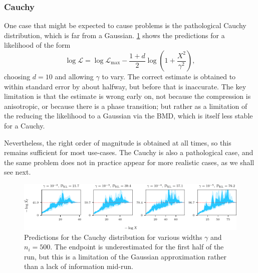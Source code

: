 \documentclass[usenatbib]{mnras}
\newcommand{\nlive}{n_i}
\begin{document}
\subsubsection{Cauchy}
One case that might be expected to cause problems is the pathological Cauchy distribution, which is far from a Gaussian. \cref{fig:cauchy_predictions} shows the predictions for a likelihood of the form
\begin{equation}
	\log\mathcal{L} = \log\mathcal{L}_\mathrm{max} - \frac{1 + d}{2} \log \left(1 + \frac{X^2}{\gamma^2}\right),
\end{equation}
choosing $d = 10$ and allowing $\gamma$ to vary. The correct estimate is obtained to within standard error by about halfway, but before that is inaccurate. The key limitation is that the estimate is wrong early on, not because the compression is anisotropic, or because there is a phase transition; but rather as a limitation of the reducing the likelihood to a Gaussian via the BMD, which is itself less stable for a Cauchy.
\par
Nevertheless, the right order of magnitude is obtained at all times, so this remains sufficient for most use-cases. The Cauchy is also a pathological case, and the same problem does not in practice appear for more realistic cases, as we shall see next.
\begin{figure}
\begin{center}
    \includegraphics{figures/cauchy_predictions.pdf}
\end{center}
\caption{Predictions for the Cauchy distribution for various widths $\gamma$ and $\nlive = 500$. The endpoint is underestimated for the first half of the run, but this is a limitation of the Gaussian approximation rather than a lack of information mid-run.}

\label{fig:cauchy_predictions}
\end{figure}
\end{document}
